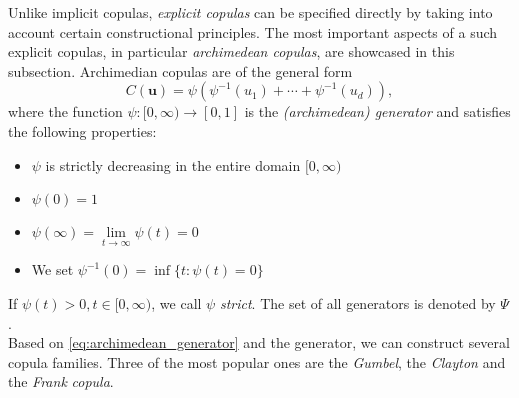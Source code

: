 
Unlike implicit copulas, \textit{explicit copulas} can be specified directly by taking into account certain constructional principles. The most important aspects of a such explicit copulas, in particular \textit{archimedean copulas}, are showcased in this subsection. Archimedian copulas are of the general form
\begin{equation}C(\boldsymbol{u})=\psi\left(\psi^{-1}\left(u_{1}\right)+\cdots+\psi^{-1}\left(u_{d}\right)\right),
\label{eq:archimedean_generator}
\end{equation}
where the function $\psi:[0, \infty) \rightarrow[0,1]$ is the \textit{(archimedean) generator} and satisfies the following properties:
\begin{itemize}
\item $\psi$ is strictly decreasing in the entire domain $[0, \infty)$
\item $\psi (0) = 1$
\item $\psi(\infty)=\lim \limits _{t \rightarrow \infty} \psi(t)=0$
\item We set $\psi^{-1}(0)=\inf \{t: \psi(t)=0\}$
\end{itemize}
If $\psi(t)>0, t \in[0, \infty)$, we call $\psi$ \textit{strict}. The set of all generators is denoted by $\Psi$.\\
Based on \autoref{eq:archimedean_generator} and the generator, we can construct several copula families. Three of the most popular ones are the \textit{Gumbel}, the \textit{Clayton} and the \textit{Frank} \textit{copula}.




